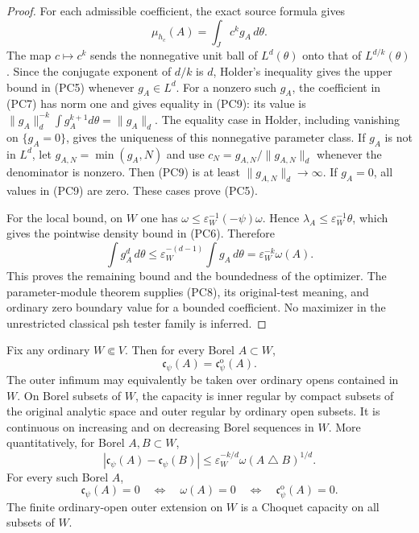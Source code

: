 \begin{proof}
For each admissible coefficient, the exact source formula gives
\[
                       \mu_{h_c}(A)=\int_J c^k g_A\,d\theta.
                                                                    \tag{PC9}
\]
The map $c\mapsto c^k$ sends the nonnegative unit ball of
$L^d(\theta)$ onto that of $L^{d/k}(\theta)$. Since the
conjugate exponent of $d/k$ is $d$, Holder's inequality gives
the upper bound in (PC5) whenever $g_A\in L^d$.
For a nonzero such $g_A$, the coefficient in (PC7) has norm one
and gives equality in (PC9): its value is
$\|g_A\|_d^{-k}\int g_A^{k+1}d\theta=\|g_A\|_d$.
The equality case in Holder, including vanishing on $\{g_A=0\}$,
gives the uniqueness of this nonnegative parameter class.
If $g_A$ is not in $L^d$, let $g_{A,N}=\min(g_A,N)$ and use
$c_N=g_{A,N}/\|g_{A,N}\|_d$ whenever the denominator is nonzero.
Then (PC9) is at least $\|g_{A,N}\|_d\to\infty$.
If $g_A=0$, all values in (PC9) are zero. These cases prove (PC5).

For the local bound, on $W$ one has
$\omega\le\varepsilon_W^{-1}(-\psi)\omega$. Hence
$\lambda_A\le\varepsilon_W^{-1}\theta$, which gives the
pointwise density bound in (PC6). Therefore
\[
             \int g_A^d\,d\theta
                    \le\varepsilon_W^{-(d-1)}\int g_A\,d\theta
                    =\varepsilon_W^{-k}\omega(A).
\]
This proves the remaining bound and the boundedness of the
optimizer. The parameter-module theorem supplies (PC8), its
original-test meaning, and ordinary zero boundary value for a
bounded coefficient. No maximizer in the unrestricted classical
psh tester family is inferred.
\end{proof}

\begin{theorem}
\label{thm:r12-parameter-energy-capacity-regularity}
Fix any ordinary $W\Subset V$. Then for every Borel $A\subset W$,
\[
                  \mathfrak c_\psi(A)=\mathfrak c_\psi^{\mathrm o}(A).
                                                                    \tag{PC10}
\]
The outer infimum may equivalently be taken over ordinary opens
contained in $W$. On Borel subsets of $W$, the capacity is inner
regular by compact subsets of the original analytic space and
outer regular by ordinary
open subsets. It is continuous on increasing and on decreasing
Borel sequences in $W$. More quantitatively, for Borel $A,B\subset W$,
\[
       |\mathfrak c_\psi(A)-\mathfrak c_\psi(B)|
                 \le\varepsilon_W^{-k/d}\omega(A\mathbin\triangle B)^{1/d}.
                                                                    \tag{PC11}
\]
For every such Borel $A$,
\[
       \mathfrak c_\psi(A)=0
          \quad\Longleftrightarrow\quad\omega(A)=0
          \quad\Longleftrightarrow\quad
                            \mathfrak c_\psi^{\mathrm o}(A)=0.
                                                                    \tag{PC12}
\]
The finite ordinary-open outer extension on $W$ is a Choquet
capacity on all subsets of $W$.
\end{theorem}

